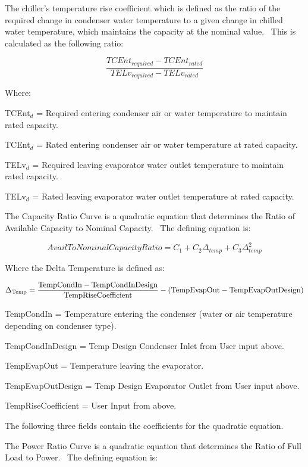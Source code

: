 The chiller's temperature rise coefficient which is defined as the ratio of the required change in condenser water temperature to a given change in chilled water temperature, which maintains the capacity at the nominal value.~ This is calculated as the following ratio:

\begin{equation}
\frac{{TCEn{t_{required}} - TCEn{t_{rated}}}}{{TEL{v_{required}} - TEL{v_{rated}}}}
\end{equation}

Where:

TCEnt\(_{d}\) = Required entering condenser air or water temperature to maintain rated capacity.

TCEnt\(_{d}\) = Rated entering condenser air or water temperature at rated capacity.

TELv\(_{d}\) = Required leaving evaporator water outlet temperature to maintain rated capacity.

TELv\(_{d}\) = Rated leaving evaporator water outlet temperature at rated capacity.

The Capacity Ratio Curve is a quadratic equation that determines the Ratio of Available Capacity to Nominal Capacity.~ The defining equation is:

\begin{equation}
AvailToNominalCapacityRatio = {C_1} + {C_2}{\Delta_{temp}} + {C_3}\Delta_{temp}^2
\end{equation}

Where the Delta Temperature is defined as:

\begin{equation}
{\Delta_{{\rm{Temp}}}} = \frac{{{\rm{TempCondIn  -  TempCondInDesign }}}}{{{\rm{TempRiseCoefficient}}}} - ({\rm{TempEvapOut  -  TempEvapOutDesign)}}
\end{equation}

TempCondIn = Temperature entering the condenser (water or air temperature depending on condenser type).

TempCondInDesign = Temp Design Condenser Inlet from User input above.

TempEvapOut = Temperature leaving the evaporator.

TempEvapOutDesign = Temp Design Evaporator Outlet from User input above.

TempRiseCoefficient = User Input from above.

The following three fields contain the coefficients for the quadratic equation.

The Power Ratio Curve is a quadratic equation that determines the Ratio of Full Load to Power.~ The defining equation is:

